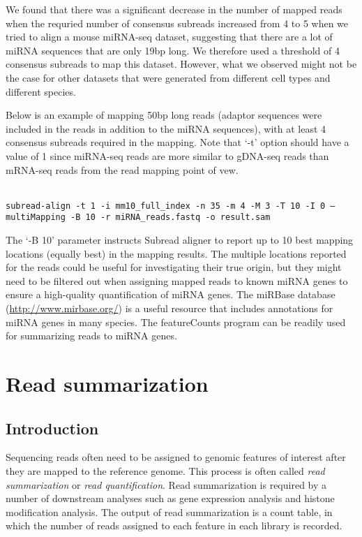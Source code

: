 \documentclass[12pt]{report}
\newcommand{\code}[1]{{\small\texttt{#1}}}
\newcommand{\Subread}{\textsf{Subread}}
\newcommand{\featureCounts}{\textsf{featureCounts}}
\begin{document}
We found that there was a significant decrease in the number of mapped reads when the requried number of consensus subreads increased from 4 to 5 when we tried to align a mouse miRNA-seq dataset, suggesting that there are a lot of miRNA sequences that are only 19bp long.
We therefore used a threshold of 4 consensus subreads to map this dataset.
However, what we observed might not be the case for other datasets that were generated from different cell types and different species.

Below is an example of mapping 50bp long reads (adaptor sequences were included in the reads in addition to the miRNA sequences), with at least 4 consensus subreads required in the mapping.
Note that `-t' option should have a value of 1 since miRNA-seq reads are more similar to gDNA-seq reads than mRNA-seq reads from the read mapping point of vew.

\code{\\
subread-align -t 1 -i mm10\_full\_index -n 35 -m 4 -M 3 -T 10 -I 0
--multiMapping -B 10 -r miRNA\_reads.fastq -o result.sam\\
}

The `-B 10' parameter instructs {\Subread} aligner to report up to 10 best mapping locations (equally best) in the mapping results.
The multiple locations reported for the reads could be useful for investigating their true origin, but they might need to be filtered out when assigning mapped reads to known miRNA genes to ensure a high-quality quantification of miRNA genes.
The miRBase database (\url{http://www.mirbase.org/}) is a useful resource that includes annotations for miRNA genes in many species.
The {\featureCounts} program can be readily used for summarizing reads to miRNA genes.



\chapter{Read summarization}

\section{Introduction}

Sequencing reads often need to be assigned to genomic features of interest after they are mapped to the reference genome.
This process is often called \emph{read summarization} or \emph{read quantification}.
Read summarization is required by a number of downstream analyses such as gene expression analysis and histone modification analysis.
The output of read summarization is a count table, in which the number of reads assigned to each feature in each library is recorded.
\end{document}
